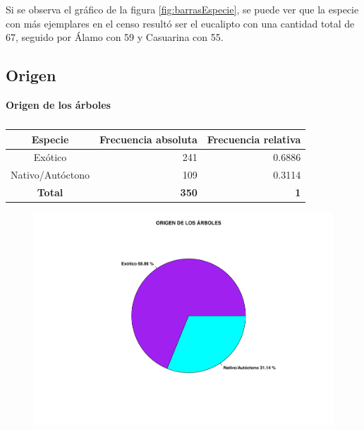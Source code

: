 \documentclass[11pt]{article}
\begin{document}
\begin{justify}
  Si se observa el gráfico de la figura \ref{fig:barrasEspecie},
  se puede ver que la especie con más ejemplares en el censo resultó
  ser el eucalipto con una cantidad total de 67, seguido por Álamo
  con 59 y Casuarina con 55.
\end{justify}


\newpage
\subsection{Origen}

\begin{table}[h!]
  \begin{center}
    \caption*{\textbf{Origen de los árboles}}
    \begin{tabular}{| c | r | r |}
      \hline
      \textbf{Especie} & \textbf{Frecuencia absoluta} &
      \textbf{Frecuencia relativa}                                 \\ \hline
      Exótico          & 241                          & 0.6886     \\ \hline
      Nativo/Autóctono & 109                          & 0.3114     \\ \hline
      \textbf{Total}   & \textbf{350}                 & \textbf{1} \\ \hline
    \end{tabular}
    \caption{}
    \label{tab:tablaOrigen}
  \end{center}
\end{table}

\begin{figure}[h!]
  \begin{center}
    \includegraphics[width=0.9\linewidth]{pieOrigen.pdf}
    \caption{}
    \label{fig:pieOrigen}
  \end{center}
\end{figure}
\end{document}
